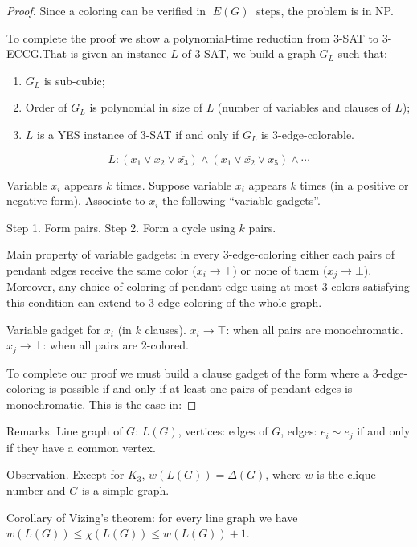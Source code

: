 \documentclass[12pt,a4paper]{article} \usepackage{fontspec}
\begin{document}
\begin{proof} Since a coloring can be verified in \(|E(G)|\) steps, the problem
is in NP.\@

  To complete the proof we show a polynomial-time reduction from \(3\)-SAT to
\(3\)-ECCG.\@ That is given an instance \(L\) of \(3\)-SAT, we build a graph
\(G_L\) such that:

  \begin{enumerate} \item \(G_L\) is sub-cubic; \item Order of \(G_L\) is
polynomial in size of \(L\) (number of variables and clauses of \(L\)); \item
\(L\) is a YES instance of \(3\)-SAT if and only if \(G_L\) is
\(3\)-edge-colorable.  \end{enumerate}

  \[L: (x_1 \vee x_2 \vee \bar{x_3}) \wedge (x_1 \vee \bar{x_2} \vee x_5) \wedge
\cdots\]

  Variable \(x_i\) appears \(k\) times. Suppose variable \(x_i\) appears \(k\)
times (in a positive or negative form).  Associate to \(x_i\) the following
\enquote{variable gadgets}.

  Step 1. Form pairs.  Step 2. Form a cycle using \(k\) pairs.


  Main property of variable gadgets: in every \(3\)-edge-coloring either each
pairs of pendant edges receive the same color (\(x_i \to \top\)) or none of them
(\(x_j \to \bot\)).  Moreover, any choice of coloring of pendant edge using at
most \(3\) colors satisfying this condition can extend to \(3\)-edge coloring of
the whole graph.

  Variable gadget for \(x_i\) (in \(k\) clauses).  \(x_i \to \top\): when all
pairs are monochromatic.  \(x_j \to \bot\): when all pairs are \(2\)-colored.

  To complete our proof we must build a clause gadget of the form where a
\(3\)-edge-coloring is possible if and only if at least one pairs of pendant
edges is monochromatic. This is the case in: \end{proof}

Remarks.  Line graph of \(G\): \(L(G)\), vertices: edges of \(G\), edges: \(e_i
\sim e_j\) if and only if they have a common vertex.

Observation.  Except for \(K_3\), \(w(L(G)) = \Delta(G)\), where \(w\) is the
clique number and \(G\) is a simple graph.

Corollary of Vizing's theorem: for every line graph we have \(w(L(G)) \leq
\chi(L(G)) \leq w(L(G)) + 1\).
\end{document}
